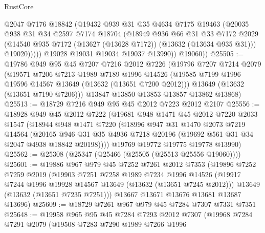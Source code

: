 \begin{lexlean}{RustCore}
\begin{coremodule}
                @2047
                @7176
                @18842
                (@19432
                  @939
                  @31
                  @35
                  @4634
                  @7175
                  @19463
                  (@20035
                    @938
                    @31
                    @34
                    @2597
                    @7174
                    @18704
                    (@18949
                      @936
                      @66
                      @31
                      @33
                      @7172
                      @2029
                      (@14540 @935 @7172 (@13627 (@13628 @7172)) (@13632 (@13634 @935 @31)))
                      @19020)))))
            @19028
            @19031
            @19034
            @19037
            @13990))
        @19060))
@25505 := @19786
    @949
    @95
    @45
    @7207
    @7216
    @2012
    @7226
    (@19796
      @7207
      @7214
      @2079
      (@19571
        @7206
        @7213
        @1989
        @7189
        @1996
        @14526
        (@19585 @7199 @1996 @19596 @14567 @13649 (@13632 (@13651 @7200 @2012)))
        @13649
        (@13632 (@13651 @7190 @7206)))
      @13847
      @13850
      @13853
      @13857
      @13862
      @13868)
@25513 := @18729 @7216 @949 @95 @45 @2012 @7223 @2012 @2107
@25556 := @18928
    @949
    @45
    @2012
    @7222
    (@19681
      @948
      @1471
      @45
      @2012
      @7220
      @2033
      @1547
      (@18944
        @948
        @1471
        @7220
        (@18996
          @947
          @31
          @1470
          @2073
          @7219
          @14564
          (@20165 @946 @31 @35 @4936 @7218 @20196 (@19692 @561 @31 @34 @2047 @4938 @18842 @20198))))
      @19769
      @19772
      @19775
      @19778
      @13990)
@25562 := @25308 (@25347 (@25466 (@25505 (@25513 @25556 @19060))))
@25601 := @19886
    @967
    @979
    @45
    @7252
    @7261
    @2012
    @7353
    (@19896
      @7252
      @7259
      @2019
      (@19903
        @7251
        @7258
        @1989
        @7234
        @1996
        @14526
        (@19917 @7244 @1996 @19928 @14567 @13649 (@13632 (@13651 @7245 @2012)))
        @13649
        (@13632 (@13651 @7235 @7251)))
      @13667
      @13671
      @13676
      @13681
      @13687
      @13696)
@25609 := @18729 @7261 @967 @979 @45 @7284 @7307 @7331 @7351
@25648 := @19958
    @965
    @95
    @45
    @7284
    @7293
    @2012
    @7307
    (@19968
      @7284
      @7291
      @2079
      (@19508
        @7283
        @7290
        @1989
        @7266
        @1996

\end{coremodule}
\end{lexlean}
